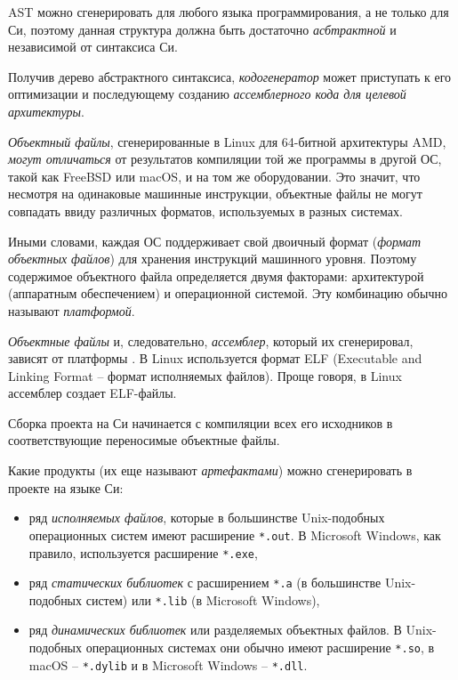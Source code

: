 \documentclass[%
	11pt,
	a4paper,
	utf8,
		]{article}
\begin{document}
AST можно сгенерировать для любого языка программирования, а не только для Си, поэтому данная структура должна быть достаточно \emph{асбтрактной} и независимой от синтаксиса Си. 

Получив дерево абстрактного синтаксиса, \emph{кодогенератор} может приступать к его оптимизации и последующему созданию \emph{ассемблерного кода для целевой архитектуры}.

\emph{Объектный файлы}, сгенерированные в Linux для 64-битной архитектуры AMD, \emph{могут отличаться} от результатов компиляции той же программы в другой ОС, такой как FreeBSD или macOS, и на том же оборудовании. Это значит, что несмотря на одинаковые машинные инструкции, объектные файлы не могут совпадать ввиду различных форматов, используемых в разных системах.

Иными словами, каждая ОС поддерживает свой двоичный формат (\emph{формат объектных файлов}) для хранения инструкций машинного уровня. Поэтому содержимое объектного файла определяется двумя факторами: архитектурой (аппаратным обеспечением) и операционной системой. Эту комбинацию обычно называют \emph{платформой}.

\emph{Объектные файлы} и, следовательно, \emph{ассемблер}, который их сгенерировал, зависят от платформы \cite[]{amini-extreme-c:2022}. В Linux используется формат ELF (Executable and Linking Format -- формат исполняемых файлов). Проще говоря, в Linux ассемблер создает ELF-файлы.

Сборка проекта на Си начинается с компиляции всех его исходников в соответствующие переносимые объектные файлы.

Какие продукты (их еще называют \emph{артефактами}) можно сгенерировать в проекте на языке Си:
\begin{itemize}
	\item ряд \emph{исполняемых файлов}, которые в большинстве Unix-подобных операционных систем имеют расширение \verb|*.out|. В Microsoft Windows, как правило, используется расширение \verb|*.exe|,
	
	\item ряд \emph{статических библиотек} с расширением \verb|*.a| (в большинстве Unix-подобных систем) или \verb|*.lib| (в Microsoft Windows),
	
	\item ряд \emph{динамических библиотек} или разделяемых объектных файлов. В Unix-подобных операционных системах они обычно имеют расширение \verb|*.so|, в macOS -- \verb|*.dylib| и в Microsoft Windows -- \verb|*.dll|.
\end{itemize}
\end{document}
